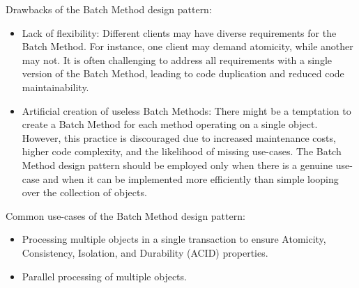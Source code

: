 Drawbacks of the Batch Method design pattern:

\begin{itemize}
    \item Lack of flexibility:
    Different clients may have diverse requirements for the Batch Method.
    For instance, one client may demand atomicity, while another may not.
    It is often challenging to address all requirements with a single version of the Batch Method,
    leading to code duplication and reduced code maintainability.
    \item Artificial creation of useless Batch Methods:
    There might be a temptation to create a Batch Method for each method operating on a single object.
    However, this practice is discouraged due to increased maintenance costs, higher code complexity,
    and the likelihood of missing use-cases.
    The Batch Method design pattern should be employed only when there is a genuine use-case and when
    it can be implemented more efficiently than simple looping over the collection of objects.
\end{itemize}

Common use-cases of the Batch Method design pattern:

\begin{itemize}
    \item
    Processing multiple objects in a single transaction to ensure Atomicity, Consistency, Isolation,
    and Durability (ACID) properties.
    \item Parallel processing of multiple objects.
\end{itemize}
